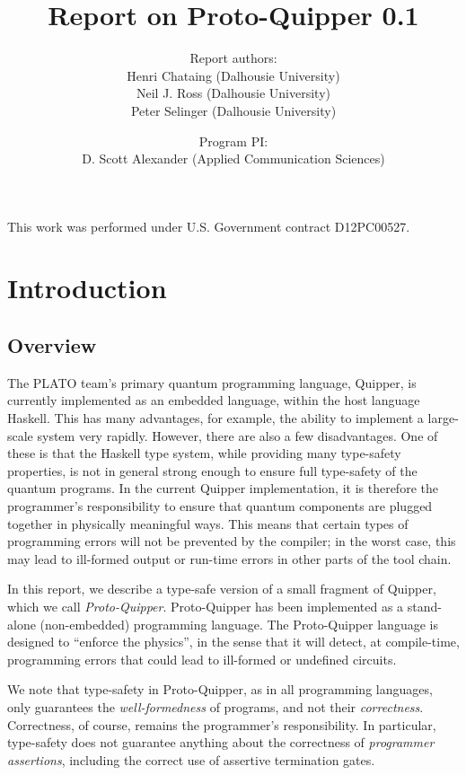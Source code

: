 \documentclass[twoside]{article}
\title{Report on Proto-Quipper 0.1}
\author{Report authors: \\
  Henri Chataing (Dalhousie University)\\
  Neil J. Ross (Dalhousie University)\\
  Peter Selinger (Dalhousie University)
}
\date{Program PI:\\
  D. Scott Alexander (Applied Communication Sciences)}
\begin{document}
\maketitle
\thispagestyle{fancy}

This work was performed under U.S. Government contract D12PC00527.
\vspace{-1ex}

\tableofcontents

\clearpage
\section{Introduction}

\subsection{Overview}

The PLATO team's primary quantum programming language, Quipper, is
currently implemented as an embedded language, within the host
language Haskell. This has many advantages, for example, the ability
to implement a large-scale system very rapidly. However, there are
also a few disadvantages. One of these is that the Haskell type
system, while providing many type-safety properties, is not in general
strong enough to ensure full type-safety of the quantum programs. In
the current Quipper implementation, it is therefore the programmer's
responsibility to ensure that quantum components are plugged together
in physically meaningful ways. This means that certain types of
programming errors will not be prevented by the compiler; in the worst
case, this may lead to ill-formed output or run-time errors in other
parts of the tool chain.

In this report, we describe a type-safe version of a small fragment of
Quipper, which we call {\em Proto-Quipper}. Proto-Quipper has been
implemented as a stand-alone (non-embedded) programming language.  The
Proto-Quipper language is designed to ``enforce the physics'', in the
sense that it will detect, at compile-time, programming errors that
could lead to ill-formed or undefined circuits.  

We note that type-safety in Proto-Quipper, as in all programming
languages, only guarantees the {\em well-formedness} of programs, and
not their {\em correctness}. Correctness, of course, remains the
programmer's responsibility. In particular, type-safety does not
guarantee anything about the correctness of {\em programmer
  assertions}, including the correct use of assertive termination
gates. 
\end{document}
